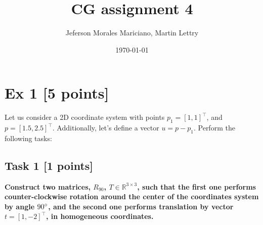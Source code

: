 \documentclass{article}
\title{CG assignment 4}
\author{Jeferson Morales Mariciano, Martin Lettry}
\date{\today}
\begin{document}
\maketitle

\section*{Ex 1 [5 points]}
Let us consider a 2D coordinate system with points $p_1 = [1, 1]^\intercal$,
and $p = [1.5, 2.5]^\intercal$.
Additionally, let's define a vector $u = p - p_1$.
Perform the following tasks:

\subsection*{Task 1 [1 points]}
\textbf{Construct two matrices, $R_{90}$, $T \in \mathbb{R}^{3 \times 3}$,
such that the first one performs counter-clockwise rotation around
the center of the coordinates system by angle $90 \degree$, and the second one performs translation
by vector $t = [1, -2]^\intercal$, in homogeneous coordinates.}
\end{document}

